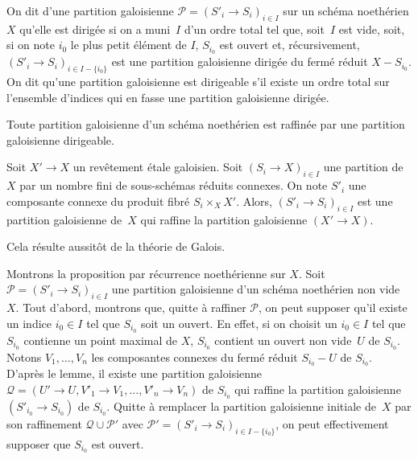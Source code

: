 \documentclass[10pt]{../fichiers-configuration-latex/smfart}
\begin{document}
\begin{definition2}
On dit d'une partition galoisienne $\mathscr P=(S'_i\to S_i)_{i\in I}$ sur
un schéma noethérien $X$
qu'elle est dirigée si on a muni $I$ d'un ordre total tel que, soit $I$ est
vide, soit, si on note $i_0$ le plus petit élément de $I$, $S_{i_0}$ est
ouvert et, récursivement, $(S'_i\to S_i)_{i\in I-\{i_0\}}$ est une
partition galoisienne dirigée du fermé réduit $X-S_{i_0}$. On dit qu'une
partition galoisienne est dirigeable s'il existe un ordre total sur
l'ensemble d'indices qui en fasse une partition galoisienne dirigée.
\end{definition2}

\begin{proposition2}\label{17-proposition-raffinements-dirigeables}
Toute partition galoisienne d'un schéma noethérien est raffinée par une
partition galoisienne dirigeable.
\end{proposition2}

\begin{lemme2}
Soit $X'\to X$ un revêtement étale galoisien. Soit $(S_i\to X)_{i\in I}$
une partition de $X$ par un nombre fini de sous-schémas réduits connexes.
On note $S'_i$ une composante connexe du produit fibré $S_i\times_X X'$.
Alors, $(S'_i\to S_i)_{i\in I}$ est une partition galoisienne de $X$ qui
raffine la partition galoisienne $(X'\to X)$.
\end{lemme2}

Cela résulte aussitôt de la théorie de Galois.

\bigskip

Montrons la proposition par récurrence noethérienne sur $X$. Soit $\mathscr
P=(S'_i\to
S_i)_{i\in I}$ une partition galoisienne d'un schéma noethérien non vide
$X$. Tout d'abord, montrons que, quitte à 
raffiner $\mathscr P$, on peut supposer qu'il
existe un indice $i_0\in I$ tel que $S_{i_0}$ soit un ouvert. En effet, si
on choisit un $i_0\in I$ tel que $S_{i_0}$ contienne un point
maximal de $X$, $S_{i_0}$ contient un ouvert non vide $U$ de
$S_{i_0}$. Notons $V_1,\dots,V_n$ les composantes connexes du
fermé réduit $S_{i_0}-U$ de $S_{i_0}$.
D'après le lemme, il existe une partition
galoisienne $\mathscr Q=
(U'\to U,V'_1\to V_1,\dots,V'_n\to V_n)$ de $S_{i_0}$ qui
raffine la partition galoisienne $(S'_{i_0}\to S_{i_0})$ de $S_{i_0}$.
Quitte à remplacer la partition galoisienne initiale de $X$ par son
raffinement $\mathscr Q\cup \mathscr P'$ avec
$\mathscr P'=(S'_i\to S_i)_{i\in I-\{i_0\}}$, on peut effectivement
supposer que $S_{i_0}$ est ouvert.
\end{document}
